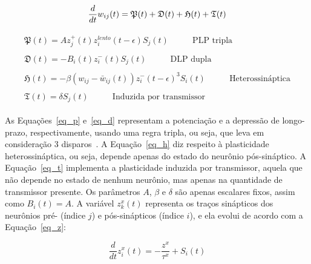 \begin{samepage}

\begin{equation}
\label{eq_pdtd}
\frac{d}{dt}w_{ij}(t) = \mathfrak{P}(t) + \mathfrak{D}(t) + \mathfrak{H}(t) + \mathfrak{T}(t)\\
\end{equation}

\begin{align}
\begin{split}\label{eq_p}
  \mathfrak{P}(t) = Az_j^+(t) z_i^{lento}(t - \epsilon)S_j(t){} & \quad\quad\text{PLP tripla}
\end{split}\\
\begin{split}\label{eq_d}
  \mathfrak{D}(t) = - B_i(t)z_i^- (t)S_j(t){} & \quad\quad\text{DLP dupla}
\end{split}\\
\begin{split}\label{eq_h}
  \mathfrak{H}(t) = - \beta (w_{ij} - \bar{w}_{ij}(t)) {z_i^- (t - \epsilon)}^3 S_i(t){} & \quad\quad\text{Heterossináptica}
\end{split}\\
\begin{split}\label{eq_t}
  \mathfrak{T}(t) = \delta S_j(t){} & \quad\quad\text{Induzida por transmissor}
\end{split}
\end{align}

\end{samepage}

As Equações~\ref{eq_p} e~\ref{eq_d} representam a potenciação e a depressão de longo-prazo, respectivamente, usando uma regra
tripla, ou seja, que leva em consideração 3 disparos~\cite{pfisterTriplets2006}. A Equação~\ref{eq_h} diz respeito à plasticidade
heterossináptica, ou seja, depende apenas do estado do neurônio pós-sináptico. A Equação~\ref{eq_t} implementa a plasticidade
induzida por transmissor, aquela que não depende no estado de nenhum neurônio, mas apenas na quantidade de transmissor presente.
Os parâmetros $A$, $\beta$ e $\delta$ são apenas escalares fixos, assim como $B_i(t)=A$. A variável $z_k^x(t)$ representa os
traços sinápticos dos neurônios pré- (índice $j$) e pós-sinápticos (índice $i$), e ela evolui de acordo com a Equação~\ref{eq_z}:

\begin{equation}
\label{eq_z}
\frac{d}{dt}z_i^x(t) = - \frac{z^x}{\tau^x}+S_i(t)
\end{equation}


